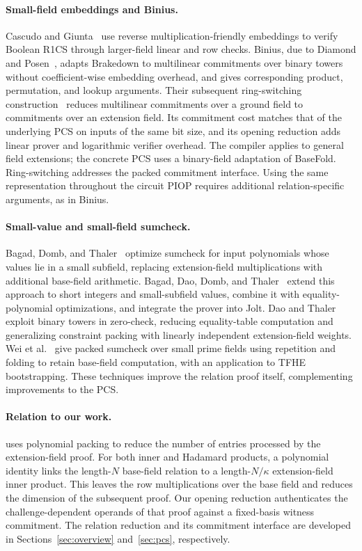 \paragraph{Small-field embeddings and Binius.}
Cascudo and Giunta~\cite{iacr/CascudoG21} use reverse
multiplication-friendly embeddings to verify Boolean R1CS through
larger-field linear and row checks.
Binius, due to Diamond and Posen~\cite{eurocrypt/DiamondP25},
adapts Brakedown to multilinear commitments over binary towers
without coefficient-wise embedding overhead, and gives corresponding
product, permutation, and lookup arguments.
Their subsequent ring-switching construction~\cite{eurocrypt/DiamondP26}
reduces multilinear commitments over a ground field to commitments
over an extension field. Its commitment cost matches that of the
underlying PCS on inputs of the same bit size, and its opening
reduction adds linear prover and logarithmic verifier overhead.
The compiler applies to general field extensions; the concrete PCS
uses a binary-field adaptation of BaseFold.
Ring-switching addresses the packed commitment interface.
Using the same representation throughout the circuit PIOP requires
additional relation-specific arguments, as in Binius.

\paragraph{Small-value and small-field sumcheck.}
Bagad, Domb, and Thaler~\cite{iacr/BagadDT24} optimize sumcheck
for input polynomials whose values lie in a small subfield, replacing
extension-field multiplications with additional base-field arithmetic.
Bagad, Dao, Domb, and Thaler~\cite{iacr/BagadDDT25} extend this
approach to short integers and small-subfield values, combine it
with equality-polynomial optimizations, and integrate the prover
into Jolt.
Dao and Thaler~\cite{iacr/DaoT24} exploit binary towers in
zero-check, reducing equality-table computation and generalizing
constraint packing with linearly independent extension-field weights.
Wei et al.~\cite{iacr/WeiWXZDWZ25} give packed sumcheck over small
prime fields using repetition and folding to retain base-field
computation, with an application to TFHE bootstrapping.
These techniques improve the relation proof itself, complementing
improvements to the PCS.

\paragraph{Relation to our work.}
\methodname uses polynomial packing to reduce the number of entries
processed by the extension-field proof.
For both inner and Hadamard products, a polynomial identity links
the length-\(N\) base-field relation to a length-\(N/\kappa\)
extension-field inner product. This leaves the row multiplications
over the base field and reduces the dimension of the subsequent
proof.
Our opening reduction authenticates the challenge-dependent
operands of that proof against a fixed-basis witness commitment.
The relation reduction and its commitment interface are developed
in Sections~\ref{sec:overview} and~\ref{sec:pcs}, respectively.
